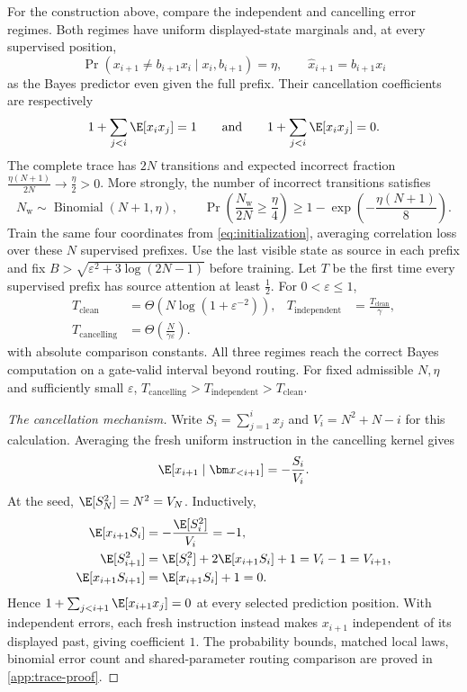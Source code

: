 \begin{mainresult}\begin{theorem}
\label{thm:causal}
For the construction above, compare the independent and cancelling error regimes.
Both regimes have uniform displayed-state marginals and, at every supervised position,
\[
 \Pr(x_{i+1}\ne b_{i+1}x_i\mid x_i,b_{i+1})=\eta,
 \qquad \hat x_{i+1}=b_{i+1}x_i
\]
as the Bayes predictor even given the full prefix.
Their cancellation coefficients are respectively
\[
 1+\sum_{j<i}\E[x_i x_j]=1\qquad\text{and}\qquad
 1+\sum_{j<i}\E[x_i x_j]=0.
\]
The complete trace has $2N$ transitions and expected incorrect fraction
$\tfrac{\eta(N+1)}{2N}\to\tfrac{\eta}{2}>0$.
More strongly, the number of incorrect transitions satisfies
\[
 N_{\mathrm w}\sim\operatorname{Binomial}(N+1,\eta),\qquad
 \Pr\!\left(\frac{N_{\mathrm w}}{2N}\ge\frac{\eta}{4}\right)
 \ge1-\exp\!\left(-\frac{\eta(N+1)}{8}\right).
\]
Train the same four coordinates from \cref{eq:initialization}, averaging correlation loss over these $N$ supervised prefixes.
Use the last visible state as source in each prefix and fix $B>\sqrt{\varepsilon^2+3\log(2N-1)}$ before training.
Let $T$ be the first time every supervised prefix has source attention at least $\tfrac{1}{2}$.
For $0<\varepsilon\le1$,
\begin{align*}
 T_{\mathrm{clean}}&=\Theta(N\log(1+\varepsilon^{-2})),&
 T_{\mathrm{independent}}&=\frac{T_{\mathrm{clean}}}{\gamma},\\
 T_{\mathrm{cancelling}}&=\Theta\!\left(\frac{N}{\gamma\varepsilon}\right).
\end{align*}
with absolute comparison constants. All three regimes reach the correct Bayes computation on a gate-valid interval beyond routing.
For fixed admissible $N,\eta$ and sufficiently small $\varepsilon$, $T_{\mathrm{cancelling}}>T_{\mathrm{independent}}>T_{\mathrm{clean}}$.
\end{theorem}\end{mainresult}
\Needspace{0.35\textheight}
\begin{proof}[The cancellation mechanism]
Write $S_i=\sum_{j=1}^i x_j$ and $V_i=N^2+N-i$ for this calculation.
Averaging the fresh uniform instruction in the cancelling kernel gives
\[
 \E[x_{i+1}\mid\bm x_{<i+1}]=-\frac{S_i}{V_i}.
\]
At the seed, $\E[S_N^2]=N^2=V_N$. Inductively,
\begin{align*}
 \E[x_{i+1}S_i]&=-\frac{\E[S_i^2]}{V_i}=-1,\\
 \E[S_{i+1}^2]&=\E[S_i^2]+2\E[x_{i+1}S_i]+1=V_i-1=V_{i+1},\\
 \E[x_{i+1}S_{i+1}]&=\E[x_{i+1}S_i]+1=0.
\end{align*}
Hence $1+\sum_{j<i+1}\E[x_{i+1}x_j]=0$ at every selected prediction position.
With independent errors, each fresh instruction instead makes $x_{i+1}$ independent of its displayed past,
giving coefficient $1$.
The probability bounds, matched local laws, binomial error count and shared-parameter routing comparison are proved in \cref{app:trace-proof}.
\end{proof}
